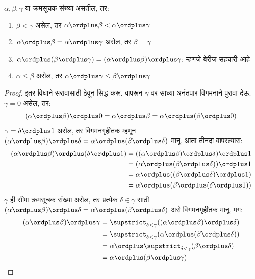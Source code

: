 \documentclass[../../../include/open-logic-section]{subfiles}
\begin{document}
\begin{lem}
$\alpha, \beta, \gamma$ या क्रमसूचक संख्या असतील, तर:
\begin{enumerate}
  \item{} $\beta < \gamma$ असेल, तर $\alpha
  \ordplus  \beta < \alpha \ordplus  \gamma$
  \item{} $\alpha \ordplus  \beta =
  \alpha\ordplus \gamma$ असेल, तर $\beta = \gamma$
  \item{} $\alpha \ordplus  (\beta \ordplus
  \gamma) = (\alpha \ordplus  \beta) \ordplus  \gamma$; म्हणजे बेरीज सहचारी आहे
  \item{} $\alpha \leq \beta$ असेल, तर $\alpha
  \ordplus  \gamma \leq \beta \ordplus \gamma$
\end{enumerate}
\end{lem}

\begin{proof}
इतर विधाने सरावासाठी ठेवून  सिद्ध करू.  वापरून $\gamma$ वर साध्या अनंतपार विगमनाने पुरावा देऊ. $\gamma = 0$ असेल, तर:
\[
(\alpha \ordplus  \beta) \ordplus  0 = \alpha \ordplus  \beta  = \alpha \ordplus  (\beta \ordplus  0)
\]
$\gamma = \delta\ordplus 1$ असेल, तर विगमनगृहीतक म्हणून $(\alpha
\ordplus  \beta) \ordplus  \delta = \alpha \ordplus  (\beta \ordplus
\delta)$ मानू. आता  तीनदा वापरल्यास:
\begin{align*}
  (\alpha \ordplus  \beta) \ordplus  (\delta \ordplus  1) & = ((\alpha \ordplus  \beta) \ordplus  \delta)\ordplus 1\\
  & = (\alpha \ordplus  (\beta \ordplus  \delta)) \ordplus  1\\
  & = \alpha \ordplus  ((\beta \ordplus  \delta)\ordplus 1)\\
  & = \alpha \ordplus  (\beta \ordplus  (\delta\ordplus 1))
\end{align*}
$\gamma$ ही सीमा क्रमसूचक संख्या असेल, तर प्रत्येक $\delta \in \gamma$ साठी $(\alpha \ordplus  \beta) \ordplus  \delta =
\alpha \ordplus  (\beta \ordplus  \delta)$ असे विगमनगृहीतक मानू. मग:
\begin{align*}
  (\alpha \ordplus  \beta) \ordplus  \gamma & = \supstrict_{\delta < \gamma}((\alpha \ordplus  \beta) \ordplus  \delta) \\
  &= \supstrict_{\delta < \gamma}(\alpha \ordplus  (\beta \ordplus  \delta))\\
  &= \alpha \ordplus  \supstrict_{\delta < \gamma}(\beta \ordplus  \delta)\\
  & = \alpha \ordplus  (\beta \ordplus  \gamma)
\end{align*}
\end{proof}
\end{document}
